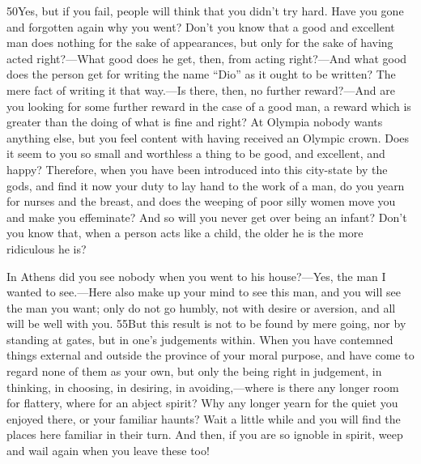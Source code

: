 50Yes, but if you fail, people will think that you didn't try hard. Have you gone and forgotten again why you went? Don't you know that a good and excellent man does nothing for the sake of appearances, but only for the sake of having acted right?—What good does he get, then, from acting right?—And what good does the person get for writing the name ``Dio'' as it ought to be written? The mere fact of writing it that way.—Is there, then, no further reward?—And are you looking for some further reward in the case of a good man, a reward which is greater than the doing of what is fine and right? At Olympia nobody wants anything else, but you feel content with having received an Olympic crown. Does it seem to you so small and worthless a thing to be good, and excellent, and happy? Therefore, when you have been introduced into this city-state by the gods, and find it now your duty to lay hand to the work of a man, do you yearn for nurses and the breast, and does the weeping of poor silly women move you and make you effeminate? And so will you never get over being an infant? Don't you know that, when a person acts like a child, the older he is the more ridiculous he is?

In Athens did you see nobody when you went to his house?—Yes, the man I wanted to see.—Here also make up your mind to see this man, and you will see the man you want; only do not go humbly, not with desire or aversion, and all will be well with you. 55But this result is not to be found by mere going, nor by standing at gates, but in one's judgements within. When you have contemned things external and outside the province of your moral purpose, and have come to regard none of them as your own, but only the being right in judgement, in thinking, in choosing, in desiring, in avoiding,—where is there any longer room for flattery, where for an abject spirit? Why any longer yearn for the quiet you enjoyed there, or your familiar haunts? Wait a little while and you will find the places here familiar in their turn. And then, if you are so ignoble in spirit, weep and wail again when you leave these too!

